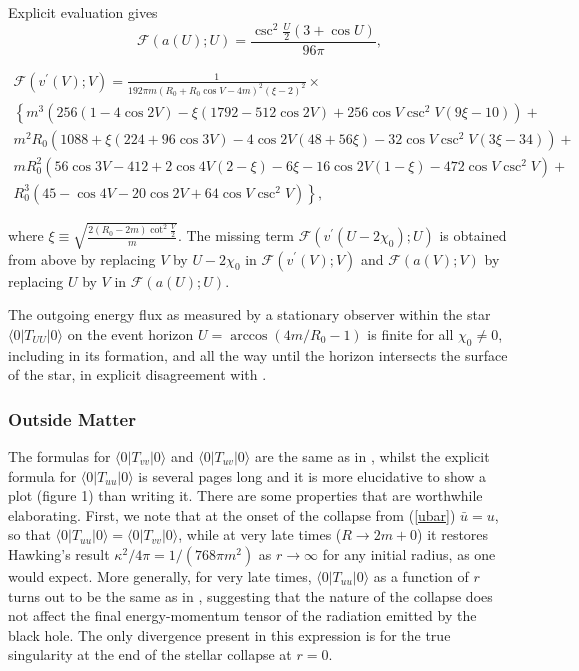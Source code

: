 \documentclass[reprint,amsmath,amssymb,aps,nofootinbib]{revtex4-1}
\begin{document}
Explicit evaluation gives
\[\mathcal F(a(U);U)=\frac{\csc^2\frac{U}{2}(3+\cos U)}{96\pi},\]
\begin{widetext}
\begin{multline*}
\mathcal F(v^\prime(V);V)=\frac{1}{192\pi m (R_0+R_0\cos V-4m)^2(\xi-2)^2}\times\\
\left\{ m^3(256(1-4\cos 2V)-\xi(1792-512\cos 2V)+256\cos V\csc^2V(9\xi-10))\right.+\\
\left.m^2R_0(1088+\xi(224+96\cos3V)-4\cos2V(48+56\xi)-32\cos V\csc^2V(3\xi-34))\right.+\\
\left.mR_0^2(56\cos3V-412+2\cos4V(2-\xi)-6\xi-16\cos2V(1-\xi)-472\cos V\csc^2V)\right.+\\
\left.R_0^3(45-\cos4V-20\cos2V+64\cos V\csc^2V)\right\},
\end{multline*}
\end{widetext}
where $\xi\equiv\sqrt{\frac{2(R_0-2m)\cot^2\frac{V}{2}}{m}}$. The missing term $\mathcal F(v^\prime(U-2\chi_0);U)$ is obtained from above by replacing $V$ by $U-2\chi_0$ in $\mathcal F(v^\prime(V);V)$ and $\mathcal F(a(V);V)$ by replacing $U$ by $V$ in  $\mathcal F(a(U);U)$.

The outgoing energy flux as measured by a stationary observer within the star $\langle0|T_{UU}|0\rangle$ on the event horizon $U=\arccos(4m/R_0-1)$ is finite for all $\chi_0\neq0$, including in its formation, and all the way until the horizon intersects the surface of the star, in explicit disagreement with \cite{Laura}.

\subsubsection{Outside Matter}
The formulas for $\langle0|T_{vv}|0\rangle$ and $\langle0|T_{uv}|0\rangle$ are the same as in \cite{DFU}, whilst the explicit formula for $\langle0|T_{uu}|0\rangle$ is several pages long and it is more elucidative to show a plot (figure 1) than writing it. There are some properties that are worthwhile elaborating. First, we note that at the onset of the collapse from (\ref{ubar}) $\bar u=u$, so that  $\langle0|T_{uu}|0\rangle=\langle0|T_{vv}|0\rangle$, while at very late times ($R\to2m+0$) it restores Hawking's result $\kappa^2/4\pi=1/(768\pi m^2)$ as $r\to\infty$ for any initial radius, as one would expect. More generally, for very late times, $\langle0|T_{uu}|0\rangle$ as a function of $r$ turns out to be the same as in \cite{DFU}, suggesting that the nature of the collapse does not affect the final energy-momentum tensor of the radiation emitted by the black hole. The only divergence present in this expression is for the true singularity at the end of the stellar collapse at $r=0$.
\end{document}

